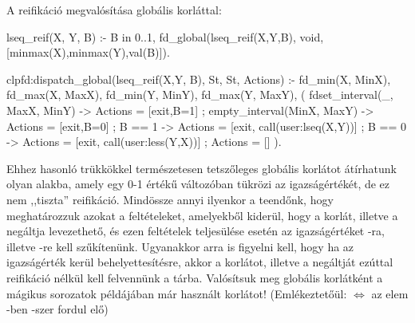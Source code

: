 A reifikáció megvalósítása globális korláttal:

\begin{prologcode}
lseq_reif(X, Y, B) :-
        B in 0..1, fd_global(lseq_reif(X,Y,B), void,
                             [minmax(X),minmax(Y),val(B)]).

clpfd:dispatch_global(lseq_reif(X,Y, B), St, St, Actions) :-
        fd_min(X, MinX), fd_max(X, MaxX),
        fd_min(Y, MinY), fd_max(Y, MaxY),
        (   fdset_interval(_, MaxX, MinY)   %
        ->  Actions = [exit,B=1]
        ;   empty_interval(MinX, MaxY)      %
        ->  Actions = [exit,B=0]
        ;   B == 1 -> Actions = [exit, call(user:lseq(X,Y))]
        ;   B == 0 -> Actions = [exit, call(user:less(Y,X))]
        ;   Actions = []
        ).
\end{prologcode}

Ehhez hasonló trükkökkel természetesen tetszőleges globális korlátot átírhatunk
olyan alakba, amely egy 0-1 értékű változóban tükrözi az igazságértékét, de
ez nem ,,tiszta'' reifikáció. Mindössze annyi ilyenkor a teendőnk, hogy meghatározzuk
azokat a feltételeket, amelyekből kiderül, hogy a korlát, illetve a negáltja levezethető,
és ezen feltételek teljesülése esetén az igazságértéket -ra, illetve -re
kell szűkítenünk. Ugyanakkor arra is figyelni kell, hogy ha az igazságérték kerül
behelyettesítésre, akkor a korlátot, illetve a negáltját ezúttal reifikáció nélkül
kell felvennünk a tárba.
\br
Valósítsuk meg globális korlátként a mágikus sorozatok példájában már használt
 korlátot! (Emlékeztetőül:  $\Leftrightarrow$
az  elem -ben -szer fordul elő)


